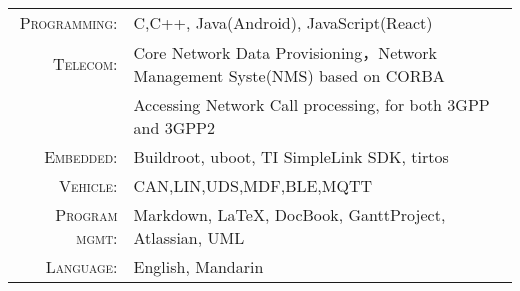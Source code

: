%
%


 
\renewcommand{\arraystretch}{1.1}

	\begin{tabular}{>{}r>{}p{13cm}} 
		\textsc{Programming:}      & C,C++, Java(Android), JavaScript(React)\\  
		\textsc{Telecom:} 		   & Core Network Data Provisioning，Network Management Syste(NMS) based on CORBA\\
							   & Accessing Network Call processing, for both 3GPP and 3GPP2 \\
		\textsc{Embedded:}	   & Buildroot, uboot, TI SimpleLink SDK, tirtos  \\
		\textsc{Vehicle:}	   & CAN,LIN,UDS,MDF,BLE,MQTT \\
		\textsc{Program mgmt:}	   & Markdown, LaTeX, DocBook, GanttProject, Atlassian, UML \\
		\textsc{Language:}	    &  English, Mandarin  \\
	\end{tabular}
	
